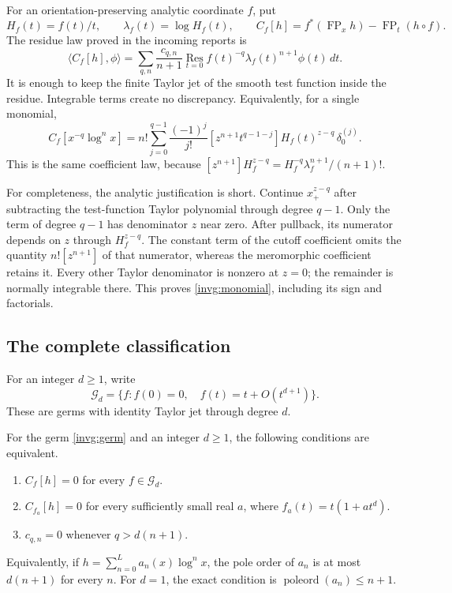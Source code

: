 For an orientation-preserving analytic coordinate $f$, put
\[
 H_f(t)=f(t)/t,\qquad \lambda_f(t)=\log H_f(t),\qquad
 C_f[h]=f^*(\operatorname{FP}_x h)-\operatorname{FP}_t(h\circ f).
\]
The residue law proved in the incoming reports is
\begin{equation}\label{invg:residue}
 \langle C_f[h],\phi\rangle
 =\sum_{q,n}\frac{c_{q,n}}{n+1}
    \operatorname*{Res}_{t=0}
     f(t)^{-q}\lambda_f(t)^{n+1}\phi(t)\,dt.
\end{equation}
It is enough to keep the finite Taylor jet of the smooth test function
inside the residue.  Integrable terms create no discrepancy.  Equivalently,
for a single monomial,
\begin{equation}\label{invg:monomial}
 C_f[x^{-q}\log^n x]
 =n!\sum_{j=0}^{q-1}\frac{(-1)^j}{j!}
 [z^{n+1}t^{q-1-j}]H_f(t)^{z-q}\,\delta_0^{(j)}.
\end{equation}
This is the same coefficient law, because
$[z^{n+1}]H_f^{z-q}=H_f^{-q}\lambda_f^{n+1}/(n+1)!$.

For completeness, the analytic justification is short.  Continue
$x_+^{z-q}$ after subtracting the test-function Taylor polynomial through
degree $q-1$.  Only the term of degree $q-1$ has denominator $z$ near
zero.  After pullback, its numerator depends on $z$ through $H_f^{z-q}$.
The constant term of the cutoff coefficient omits the quantity
$n![z^{n+1}]$ of that numerator, whereas the meromorphic coefficient
retains it.  Every other Taylor denominator is nonzero at $z=0$; the
remainder is normally integrable there.  This proves
\eqref{invg:monomial}, including its sign and factorials.

\subsection{The complete classification}

For an integer $d\ge1$, write
\[
 \mathscr G_d=\{f:f(0)=0,\quad f(t)=t+O(t^{d+1})\}.
\]
These are germs with identity Taylor jet through degree $d$.

\begin{theorem}
\label{invg:classification}
For the germ \eqref{invg:germ} and an integer $d\ge1$, the following
conditions are equivalent.
\begin{enumerate}
\item $C_f[h]=0$ for every $f\in\mathscr G_d$.
\item $C_{f_a}[h]=0$ for every sufficiently small real $a$, where
      $f_a(t)=t(1+a t^d)$.
\item $c_{q,n}=0$ whenever $q>d(n+1)$.
\end{enumerate}
Equivalently, if $h=\sum_{n=0}^{L}a_n(x)\log^n x$, the pole order of
$a_n$ is at most $d(n+1)$ for every $n$.  For $d=1$, the exact condition
is $\operatorname{poleord}(a_n)\le n+1$.
\end{theorem}

